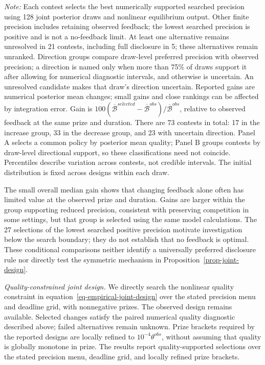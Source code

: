 \begin{table}[!htbp]
\begin{minipage}{\textwidth}
\footnotesize\textit{Note:} Each contest selects the best numerically supported searched precision using 128 joint posterior draws and nonlinear equilibrium output. Other finite precision includes retaining observed feedback; the lowest searched precision is positive and is not a no-feedback limit. At least one alternative remains unresolved in 21 contests, including full disclosure in 5; these alternatives remain unranked. Direction groups compare draw-level preferred precision with observed precision; a direction is named only when more than 75\% of draws support it after allowing for numerical diagnostic intervals, and otherwise is uncertain. An unresolved candidate makes that draw's direction uncertain. Reported gains are numerical posterior mean changes; small gains and close rankings can be affected by integration error. Gain is $100(\overline{\mathcal B}^{selected}-\overline{\mathcal B}^{obs})/\overline{\mathcal B}^{obs}$, relative to observed feedback at the same prize and duration. There are 73 contests in total: 17 in the increase group, 33 in the decrease group, and 23 with uncertain direction. Panel A selects a common policy by posterior mean quality; Panel B groups contests by draw-level directional support, so these classifications need not coincide. Percentiles describe variation across contests, not credible intervals. The initial distribution is fixed across designs within each draw.
\end{minipage}
\end{table}

The small overall median gain shows that changing feedback alone often has limited value at the observed prize and duration. Gains are larger within the group supporting reduced precision, consistent with preserving competition in some settings, but that group is selected using the same model calculations. The 27 selections of the lowest searched positive precision motivate investigation below the search boundary; they do not establish that no feedback is optimal. These conditional comparisons neither identify a universally preferred disclosure rule nor directly test the symmetric mechanism in Proposition~\ref{prop-joint-design}.

\textit{Quality-constrained joint design.} We directly search the nonlinear quality constraint in equation~\eqref{eq-empirical-joint-design} over the stated precision menu and deadline grid, with nonnegative prizes. The observed design remains available. Selected changes satisfy the paired numerical quality diagnostic described above; failed alternatives remain unknown. Prize brackets required by the reported designs are locally refined to $10^{-4}\theta^{obs}$, without assuming that quality is globally monotone in prize. The results report quality-supported selections over the stated precision menu, deadline grid, and locally refined prize brackets.

